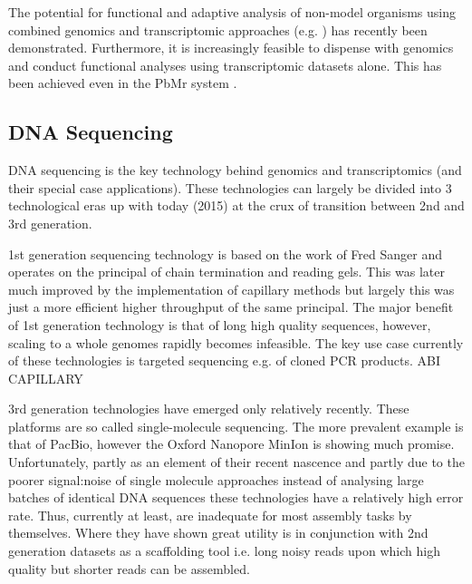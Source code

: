 The potential for functional and adaptive analysis of non-model organisms using 
combined genomics and transcriptomic approaches (e.g. \citep{Munoz-Merida2013,Feldmesser2014})
has recently been demonstrated. Furthermore, it is increasingly feasible  to dispense
with genomics and conduct functional analyses using transcriptomic datasets alone.
This has been achieved even in the PbMr system \citep{Kodama2014}.



\subsection{DNA Sequencing}

DNA sequencing is the key technology behind genomics and transcriptomics (and
their special case applications). These technologies can largely be divided into
3 technological eras up with today (2015) at the crux of transition between 2nd and 3rd
generation. 

1st generation sequencing technology is based on the work of Fred Sanger and operates
on the principal of chain termination and reading gels.
This was later much improved by the implementation of capillary methods but largely
this was just a more efficient higher throughput of the same principal.  The major
benefit of 1st generation technology is that of long high quality sequences, however,
scaling to a whole genomes rapidly becomes infeasible.  The key use case currently
of these technologies is targeted sequencing e.g. of cloned PCR products. ABI CAPILLARY

3rd generation technologies have emerged only relatively recently.
These platforms are so called single-molecule sequencing.  The more prevalent
example is that of PacBio, however the Oxford Nanopore MinIon is showing much promise.
Unfortunately, partly as an element of their recent nascence and partly due to the
poorer signal:noise of single molecule approaches instead of analysing large 
batches of identical DNA sequences these technologies have a relatively high error rate.
Thus, currently at least, are inadequate for most assembly tasks by themselves.
Where they have shown great utility is in conjunction with 2nd generation datasets
as a scaffolding tool i.e. long noisy reads upon which high quality but shorter
reads can be assembled.


